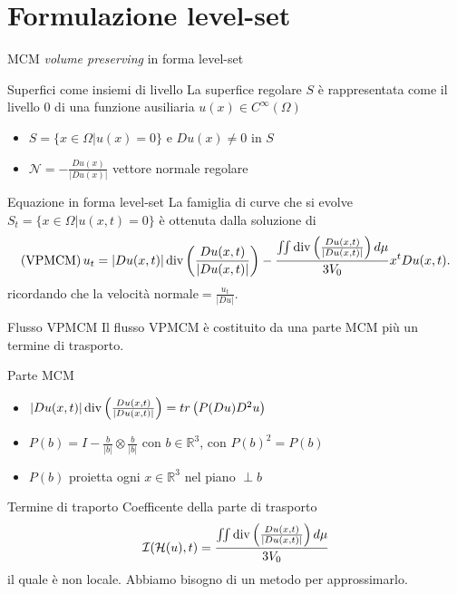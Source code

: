 \section{Formulazione level-set}
\begin{frame}{MCM \emph{volume preserving} in forma level-set}
  \begin{block}{Superfici come insiemi di livello}
    La superfice regolare $S$ è rappresentata come il livello $0$ di
    una funzione ausiliaria $u(x)\in C^{\infty}(\Omega)$
    \begin{itemize}
      \item $S=\{x\in\Omega | u(x)=0\}$ e $Du(x)\neq 0$ in $S$
      \item $\mathcal{N}=-\frac{Du(x)}{|Du(x)|}$ vettore normale
        regolare
    \end{itemize}
  \end{block}
  \begin{block}{Equazione in forma level-set}
    La famiglia di curve che si evolve $S_t=\{x\in\Omega | u(x,t)=0\}$
    è ottenuta dalla soluzione di
    \[
      (\text{VPMCM})\,u_t=|Du(x,t)|\operatorname{div}\left(\frac{Du(x,t)}{|Du(x,t)|}\right)-\frac{\iint\operatorname{div}\left(\frac{Du(x,t)}{|Du(x,t)|}\right)d\mu}{3V_0}x^tDu(x,t). 
      \]
      ricordando che la \alert{velocità normale$=\frac{u_t}{|Du|}$}.
  \end{block}
\end{frame}

\begin{frame}{Flusso VPMCM}
  Il flusso VPMCM è costituito da una parte MCM più un termine di trasporto.
  \begin{block}{Parte MCM} 
    \begin{itemize}
    \item
      $|Du(x,t)|\operatorname{div}\left(\frac{Du(x,t)}{|Du(x,t)|}\right)=tr\left(P(Du)D^2u\right)$
    \item $P(b)=I-\frac{b}{|b|}\otimes\frac{b}{|b|}$ con
      $b\in\mathbb{R}^3$, con $P(b)^2=P(b)$
    \item $P(b)$ proietta ogni $x\in\mathbb{R}^3$ nel piano $\perp b$
    \end{itemize}
  \end{block}
  \begin{block}{Termine di traporto}
     Coefficente della parte di trasporto
    \[
    \mathcal{I}(\mathcal{H}(u),t)=\frac{\iint\operatorname{div}\left(\frac{Du(x,t)}{|Du(x,t)|}\right)d\mu}{3V_0}
    \] 
    il quale è non locale. Abbiamo bisogno di un metodo per
    approssimarlo.
  \end{block}
\end{frame}


